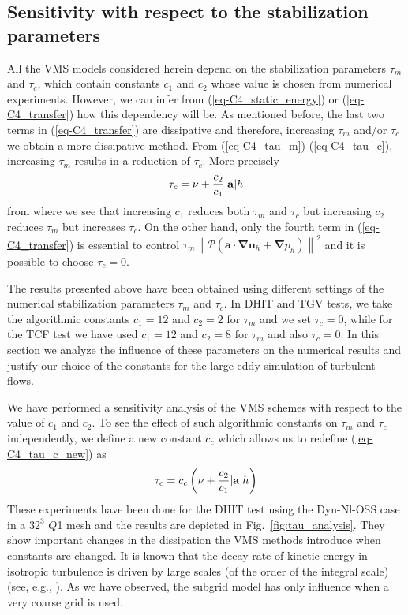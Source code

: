\subsection{Sensitivity with respect to the stabilization parameters}
\label{sec-C4_effect_const}

All the VMS models considered herein depend on the stabilization parameters $\tau_m$ and $\tau_c$, which contain constants $c_1$ and $c_2$ whose value is chosen from numerical experiments. However, we can infer from (\ref{eq-C4_static_energy}) or (\ref{eq-C4_transfer}) how this dependency will be. As mentioned before, the last two terms in (\ref{eq-C4_transfer}) are dissipative and therefore, increasing $\tau_m$ and/or $\tau_c$ we obtain a more dissipative method. From (\ref{eq-C4_tau_m})-(\ref{eq-C4_tau_c}), increasing $\tau_m$ results in a reduction of $\tau_c$. More precisely 
\begin{equation}
\label{eq-C4_tau_c_new}
\tau_c=\nu + \frac{c_2}{c_1}{|{\bf a}|}{h}
\end{equation}
from where we see that increasing $c_1$ reduces both $\tau_m$ and $\tau_c$ but increasing $c_2$ reduces $\tau_m$ but increases $\tau_c$. On the other hand, only the fourth term in (\ref{eq-C4_transfer}) is essential to control
$ \tau_{m} \left\| \mathcal{P} \left( \mathbf{a}\cdot \mathbf{\nabla u}_{h}+\mathbf{\nabla }p_{h}\right) \right\|^{2} $ and it is possible to choose $\tau_c=0$. 

The results presented above have been obtained using different settings of the numerical stabilization parameters $\tau_m$ and $\tau_c$. In DHIT and TGV tests, we take the algorithmic constants $c_1=12$ and $c_2=2$ for $\tau_m$ and we set $\tau_c=0$, while for the TCF test we have used $c_1=12$ and $c_2=8$ for $\tau_m$ and also $\tau_c=0$. In this section we analyze the influence of these parameters on the numerical results and justify our choice of the constants for the large eddy simulation of turbulent flows.

We have performed a sensitivity analysis of the VMS schemes with respect to the value of $c_1$ and $c_2$. To see the effect of such algorithmic constants on $\tau_m$ and $\tau_c$ independently, we define a new constant $c_c$ which allows us to redefine (\ref{eq-C4_tau_c_new}) as
\begin{equation}
\label{eq-C4_tau_c_cc_new}
\tau_c=c_c\left(\nu + \frac{c_2}{c_1}{|{\bf a}|}{h}\right)
\end{equation}
These experiments have been done for the DHIT test using the Dyn-Nl-OSS case in a $32^3$ $Q$1 mesh and the results are depicted in Fig.~\ref{fig:tau_analysis}. They show important changes in the dissipation the VMS methods introduce when constants are changed. %
It is known that the decay rate of kinetic energy in isotropic turbulence is driven by large scales (of the order of the integral scale) (see, e.g., \cite{comte-bellot_simple_1971}). As we have observed, the subgrid model has only influence when a very coarse grid is used.

